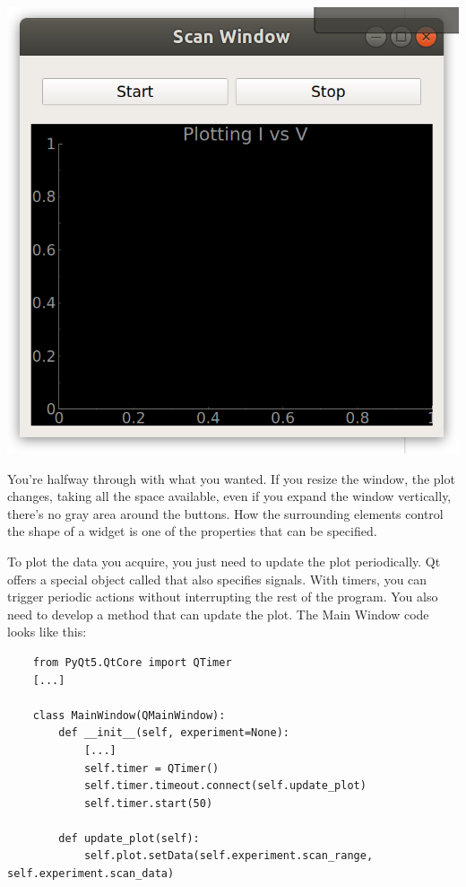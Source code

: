 \begin{center}
    \includegraphics[width=.4\textwidth]{images/Chapter_08/07_window_empty_plot.png}
\end{center}

You're halfway through with what you wanted. If you resize the window, the plot changes, taking all the space available, even if you expand the window vertically, there's no gray area around the buttons. How the surrounding elements control the shape of a widget is one of the properties that can be specified.


To plot the data you acquire, you just need to update the plot periodically. Qt offers a special object called  that also specifies signals. With timers, you can trigger periodic actions without interrupting the rest of the program. You also need to develop a method that can update the plot. The Main Window code looks like this:

\begin{verbatim}
    from PyQt5.QtCore import QTimer
    [...]

    class MainWindow(QMainWindow):
        def __init__(self, experiment=None):
            [...]
            self.timer = QTimer()
            self.timer.timeout.connect(self.update_plot)
            self.timer.start(50)

        def update_plot(self):
            self.plot.setData(self.experiment.scan_range, self.experiment.scan_data)
\end{verbatim}

